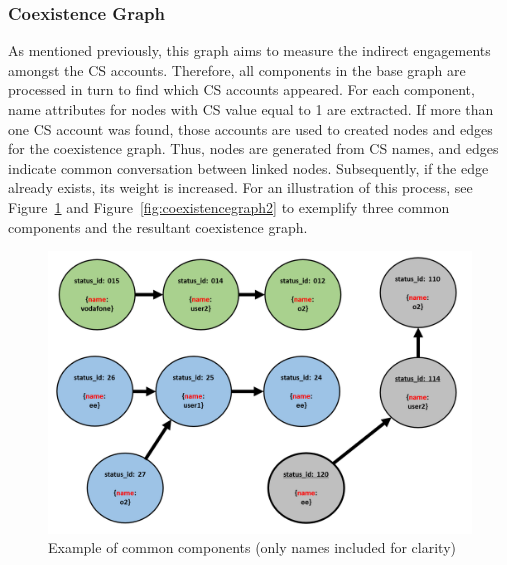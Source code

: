 \documentclass[sigconf]{acmart}
\begin{document}
{\subsubsection{Coexistence Graph}

As mentioned previously, this graph aims to measure the indirect
engagements amongst the CS accounts. Therefore, all components in the
base graph are processed in turn to find which CS accounts
appeared. For each component, name attributes for nodes with CS value
equal to 1 are extracted.  If more than one CS account was found,
those accounts are used to created nodes and edges for the coexistence
graph. Thus, nodes are generated from CS names, and edges indicate
common conversation between linked nodes. Subsequently, if the edge
already exists, its weight is increased.  For an illustration of this
process, see Figure~\ref{fig:ccmethod} and
Figure~\ref{fig:coexistencegraph2} to exemplify three common
components and the resultant coexistence graph.

\begin{figure}[htb]
\centering
\includegraphics[width=\columnwidth]{images/ccmethod.png}
\caption{Example of common components (only names included for clarity)}
\label{fig:ccmethod}
\end{figure}

}
\end{document}
